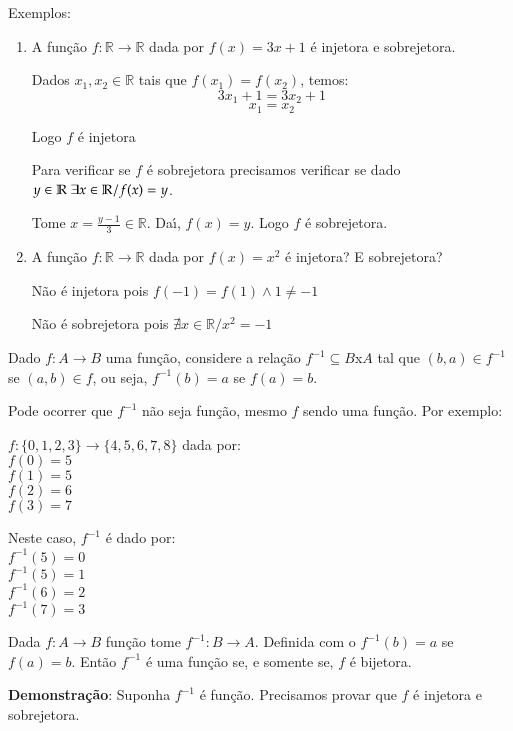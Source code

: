 Exemplos:
\begin{enumerate}
\item A fun{\c c}{\~a}o $f:\mathbb{R}\rightarrow\mathbb{R}$ dada por $f(x)=3x+1$ {\'e} injetora e sobrejetora.

Dados $x_{1}, x_{2}\in\mathbb{R}$ tais que $f(x_{1})=f(x_{2})$, temos:
\[3x_{1}+1=3x_{2}+1\]
\[x_{1}=x_{2}\]

Logo $f$ {\'e} injetora

Para verificar se $f$ {\'e} sobrejetora precisamos verificar se dado $y\in\mathbb{R}\\ \ \exists x\in\mathbb{R}/f(x)=y$.

Tome $x=\displaystyle\frac{y-1}{3}\in\mathbb{R}$. Da{\'\i}, $f(x)=y$. Logo $f$ {\'e} sobrejetora.
\item A fun{\c c}{\~a}o $f:\mathbb{R}\rightarrow\mathbb{R}$ dada por $f(x)=x^{2}$ {\'e} injetora? E sobrejetora?

N{\~a}o {\'e} injetora pois $f(-1)=f(1)\wedge 1\neq -1$

N{\~a}o {\'e} sobrejetora pois $\nexists x\in\mathbb{R}/x^{2}=-1$

\end{enumerate}

Dado $f:A\rightarrow B$ uma fun{\c c}{\~a}o, considere a rela{\c c}{\~a}o $f^{-1}\subseteq B$x$A$ tal que $(b,a)\in f^{-1}$ se $(a,b)\in f$, ou seja, $f^{-1}(b)=a$ se $f(a)=b$.

Pode ocorrer que $f^{-1}$ n{\~a}o seja fun{\c c}{\~a}o, mesmo $f$ sendo uma fun{\c c}{\~a}o. Por exemplo:

$f:\{0,1,2,3\}\rightarrow\{4,5,6,7,8\}$ dada por:\\
$f(0)=5$\\
$f(1)=5$\\
$f(2)=6$\\
$f(3)=7$

Neste caso, $f^{-1}$ {\'e} dado por:\\
$f^{-1}(5)=0$\\
$f^{-1}(5)=1$\\
$f^{-1}(6)=2$\\
$f^{-1}(7)=3$

\begin{teorema} Dada $f:A\rightarrow B$ fun{\c c}{\~a}o tome $f^{-1}:B\rightarrow A$. Definida com o $f^{-1}(b)=a$ se $f(a)=b$. Ent{\~a}o $f^{-1}$ {\'e} uma fun{\c c}{\~a}o se, e somente se, $f$ {\'e} bijetora.\end{teorema}

\textbf{Demonstra{\c c}{\~a}o}: Suponha $f^{-1}$ {\'e} fun{\c c}{\~a}o. Precisamos provar que $f$ {\'e} injetora e sobrejetora.

